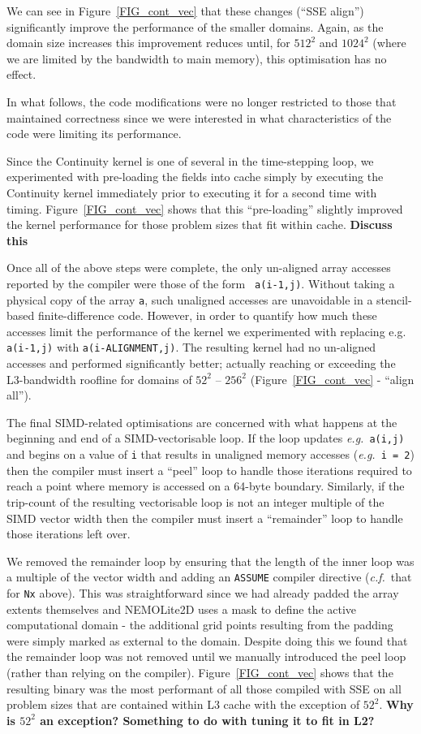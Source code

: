 \documentclass[12pt]{article}
\begin{document}
We can see in Figure~\ref{FIG_cont_vec} that these changes (``SSE
align'') significantly improve the performance of the smaller
domains. Again, as the domain size increases this improvement reduces
until, for $512^2$ and $1024^2$ (where we are limited by the bandwidth
to main memory), this optimisation has no effect.

In what follows, the code modifications were no longer restricted to
those that maintained correctness since we were interested in what
characteristics of the code were limiting its performance.

Since the Continuity kernel is one of several in the time-stepping
loop, we experimented with pre-loading the fields into cache simply by
executing the Continuity kernel immediately prior to executing it for
a second time with timing. Figure~\ref{FIG_cont_vec} shows that this
``pre-loading'' slightly improved the kernel performance for those
problem sizes that fit within cache. {\bf Discuss this}

Once all of the above steps were complete, the only un-aligned array
accesses reported by the compiler were those of the form {\tt
  a(i-1,j)}. Without taking a physical copy of the array {\tt a}, such
unaligned accesses are unavoidable in a stencil-based
finite-difference code. However, in order to quantify how much these
accesses limit the performance of the kernel we experimented with
replacing e.g. {\tt a(i-1,j)} with {\tt a(i-ALIGNMENT,j)}. The
resulting kernel had no un-aligned accesses and performed
significantly better; actually reaching or exceeding the L3-bandwidth
roofline for domains of $52^2$ -- $256^2$ (Figure~\ref{FIG_cont_vec} -
``align all'').

The final SIMD-related optimisations are concerned with what happens
at the beginning and end of a SIMD-vectorisable loop. If the loop
updates {\it e.g.}\ {\tt a(i,j)} and begins on a value of {\tt i} that
results in unaligned memory accesses ({\it e.g.}\ {\tt i = 2}) then
the compiler must insert a ``peel'' loop to handle those iterations
required to reach a point where memory is accessed on a 64-byte
boundary.  Similarly, if the trip-count of the resulting vectorisable
loop is not an integer multiple of the SIMD vector width then the
compiler must insert a ``remainder'' loop to handle those iterations
left over.

We removed the remainder loop by ensuring that the length of the inner
loop was a multiple of the vector width and adding an {\tt ASSUME}
compiler directive ({\it c.f.}\ that for {\tt Nx} above). This was
straightforward since we had already padded the array extents
themselves and NEMOLite2D uses a mask to define the active
computational domain - the additional grid points resulting from the
padding were simply marked as external to the domain.  Despite doing
this we found that the remainder loop was not removed until we
manually introduced the peel loop (rather than relying on the
compiler). Figure~\ref{FIG_cont_vec} shows that the resulting binary
was the most performant of all those compiled with SSE on all problem
sizes that are contained within L3 cache with the exception of $52^2$.
{\bf Why is $52^2$ an exception? Something to do with tuning it to fit in L2?}
\end{document}
